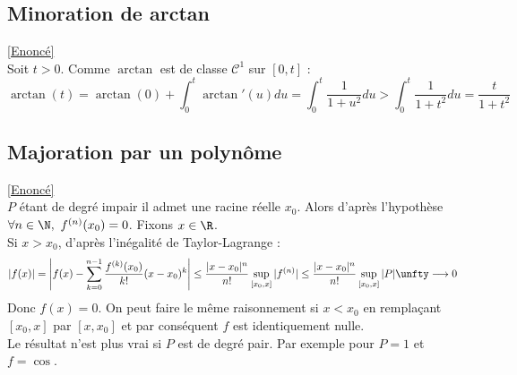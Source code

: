 \documentclass{book}
\begin{document}
	\subsection{Minoration de arctan }
	\label{Minoration de arctan corrigé}
	\textcolor{blue}{\hyperref[Minoration de arctan]{[Enoncé]}}\\
	Soit $t>0$. Comme $\arctan$ est de classe $\mathcal C^1$ sur $[0,t]$ :
	$$\arctan(t)=\arctan(0)+\displaystyle\int_0^t\arctan'(u)du=\int_0^t\frac{1}{1+u^2}du>\int_0^t\frac{1}{1+t^2}du=\frac{t}{1+t^2}$$
	
	\subsection{Majoration par un polynôme }
	\label{Majoration par un polynôme corrigé}
	\textcolor{blue}{\hyperref[Majoration par un polynôme]{[Enoncé]}}\\
	$P$ étant de degré impair il admet une racine réelle $x_0$. Alors d'après l'hypothèse $\forall n\in \N,\ f^{(n)}(x_0)=0$. Fixons $x\in \R$.\\
	Si $x>x_0$, d'après l'inégalité de Taylor-Lagrange :
	$$|f(x)|=\left|f(x)-\sum_{k=0}^{n-1}\frac{f^{(k)}(x_0)}{k!}(x-x_0)^k\right|\leq \frac{|x-x_0|^n}{n!}\sup_{[x_0,x]}|f^{(n)}|\leq \frac{|x-x_0|^n}{n!}\sup_{[x_0,x]}|P|\unfty\longrightarrow 0$$
	Donc $f(x)=0$. On peut faire le même raisonnement si $x<x_0$ en remplaçant $[x_0,x]$ par $[x,x_0]$ et par conséquent $f$ est identiquement nulle.\\
	Le résultat n'est plus vrai si $P$ est de degré pair. Par exemple pour $P=1$ et $f=\cos$.
	
\end{document}
